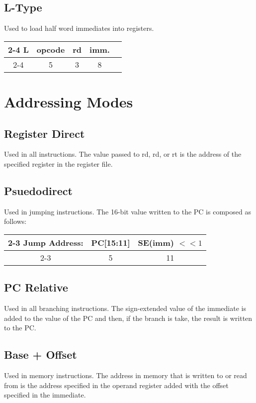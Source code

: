 \documentclass[12pt, a4paper]{report}
\begin{document}
	\subsection{L-Type}
	Used to load half word immediates into registers.
	\begin{center}
		{\renewcommand{\arraystretch}{1.5}
			\begin{tabular}[b]{c @{ } c | c | c | c|}
				\cline{2-4}
				L & \vline \hspace{1.5pt} opcode & rd & imm. \\
				\cline{2-4}
				\multicolumn{1}{}{} & \multicolumn{1}{c}{5} & \multicolumn{1}{c}{3} &
				\multicolumn{1}{c}{8}
			\end{tabular}}
	\end{center}
	
	\section{Addressing Modes}
	\subsection{Register Direct}
	Used in all instructions. The value passed to rd, rd, or rt is the address of the specified register in the register file.
	
	\subsection{Psuedodirect}
	Used in jumping instructions. The 16-bit value written to the PC is composed as follows:
	
	{\renewcommand{\arraystretch}{1.5}
		\begin{tabular}[b]{c @{ } c | c |}
			\cline{2-3}
			Jump Address:  & \vline \hspace{1.5pt} PC[15:11] & SE(imm) $<< 1$ \\
			\cline{2-3}
			\multicolumn{1}{}{} & \multicolumn{1}{c}{5} & \multicolumn{1}{c}{11}
		\end{tabular}}
	
	\subsection{PC Relative}
	Used in all branching instructions. The sign-extended value of the immediate is added to the value of the PC and then, if the
	branch is take, the result is written to the PC.
	
	\subsection{Base + Offset}
	Used in memory instructions. The address in memory that is written to or read from is the address specified in the operand register
	added with the offset specified in the immediate.
	
\end{document}
